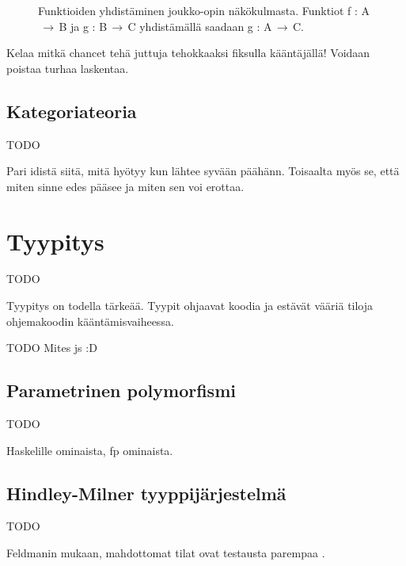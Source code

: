 \begin{figure}[htbp]
  \caption{Funktioiden yhdistäminen joukko-opin näkökulmasta. Funktiot f : A$\,\to\,$B ja g : B$\,\to\,$C yhdistämällä saadaan g : A$\,\to\,$C.}
\end{figure}


Kelaa mitkä chancet tehä juttuja tehokkaaksi fiksulla kääntäjällä! Voidaan poistaa turhaa laskentaa.

\subsection{Kategoriateoria}

TODO

Pari idistä siitä, mitä hyötyy kun lähtee syvään päähänn. Toisaalta myös se, että miten sinne edes pääsee ja miten sen voi erottaa.

\section{Tyypitys}

TODO

Tyypitys on todella tärkeää. Tyypit ohjaavat koodia ja estävät vääriä tiloja ohjemakoodin kääntämisvaiheessa.

TODO Mites \gls{js} :D



\subsection{Parametrinen polymorfismi}

TODO

Haskelille ominaista, \gls{fp} ominaista.


\subsection{Hindley-Milner tyyppijärjestelmä}

TODO

Feldmanin mukaan, mahdottomat tilat ovat testausta parempaa \cite{impossiblebetter}.

